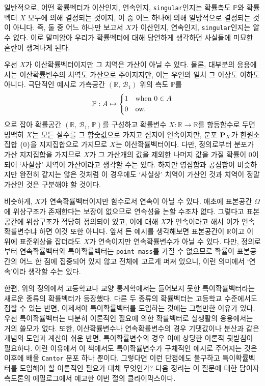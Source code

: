 일반적으로, 어떤 확률벡터가 이산인지, 연속인지, \texttt{singular}인지는 확률측도 $\mathbb{P}$와 확률벡터 $X$ 모두에 의해 결정되는 것이지, 이 중 어느 하나에 의해 일방적으로 결정되는 것이 아니다. 즉, 둘 중 어느 하나만 보고서 $X$가 이산인지, 연속인지, \texttt{singular}인지는 알 수 없다. 이로 말미암아 우리가 확률벡터에 대해 당연하게 생각하던 사실들에 미묘한 혼란이 생겨나게 된다.

우선 $X$가 이산확률벡터이지만 그 치역은 가산이 아닐 수 있다. 물론, 대부분의 응용에서는 이산확률변수의 치역도 가산으로 주어지지만, 이는 우연의 일치 그 이상도 이하도 아니다. 극단적인 예시로 가측공간 $(\mathbb{R},\,\mathcal{B}_1)$ 위의 측도 $\mathbb{P}$를
\begin{equation*}
    \mathbb{P}:A\mapsto
    \begin{dcases*}
        1&when $0\in A$\\
        0&ow.
    \end{dcases*}
\end{equation*}
으로 잡아 확률공간 $(\mathbb{R},\,\mathcal{B}_1,\,\mathbb{P})$를 구성하고 확률변수 $X:\mathbb{R}\to\mathbb{R}$를 항등함수로 두면 명백히 $X$는 모든 실수를 그 함숫값으로 가지고 심지어 연속이지만, 분포 $\mathbf{P}_X$가 한원소 집합 $\{0\}$을 지지집합으로 가지므로 $X$는 이산확률벡터이다. 다만, 정의로부터 분포가 가산 지지집합을 가지므로 $X$가 그 가산개의 값을 제외한 나머지 값을 가질 확률이 $0$이 되어 `사실상' 치역이 가산이라고 생각할 수는 있다. 하지만 영집합과 공집합이 비슷하지만 완전히 같지는 않은 것처럼 이 경우에도 `사실상' 치역이 가산인 것과 치역이 정말 가산인 것은 구분해야 할 것이다.

비슷하게, $X$가 연속확률벡터이지만 함수로서 연속이 아닐 수 있다. 애초에 표본공간 $\Omega$에 위상구조가 존재한다는 보장이 없으므로 연속성을 논할 수조차 없다. 그렇다고 표본공간에 위상구조가 적당히 정의되어 있고, 이에 대해 $X$가 연속이라고 해서 이가 연속확률변수냐 하면 이것 또한 아니다. 앞서 든 예시를 생각해보면 표본공간이 $\mathbb{R}$이고 이 위에 표준위상을 잡더라도 $X$가 연속이지만 연속확률변수가 아닐 수 있다. 다만, 정의로부터 연속확률벡터와 특이확률벡터는 \texttt{point mass}를 가질 수 없으므로 확률이 표본공간의 어느 한 점에 집중되어 있지 않고 전체에 고르게 퍼져 있으니, 이런 의미에서 `연속'이라 생각할 수는 있다.

한편, 위의 정의에서 고등학교나 교양 통계학에서는 들어보지 못한 특이확률벡터라는 새로운 종류의 확률벡터가 등장했다. 다른 두 종류의 확률벡터는 고등학교 수준에서도 접할 수 있는 반면, 이제서야 특이확률벡터를 도입하는 것에는 그럴만한 이유가 있다. 우선 특이확률벡터는 다분히 이론적인 필요에 의한 확률벡터로 실생활의 응용에서는 거의 쓸모가 없다. 또한, 이산확률변수나 연속확률변수의 경우 기댓값이나 분산과 같은 개념의 도입과 계산이 쉬운 반면, 특이확률변수의 경우 이에 상당한 이론적 뒷받침이 필요하다. 이런 이유에서 이 책에서도 특이확률변수가 구체적인 예시로 주어지는 것은 이후에 배울 \texttt{Cantor} 분포 하나 뿐이다. 그렇다면 이런 단점에도 불구하고 특이확률벡터를 도입해야 할 이론적인 필요가 대체 무엇인가? 다음 정리는 이 질문에 대한 답이자 측도론의 에필로그에서 예고한 이번 절의 클라이막스이다.

